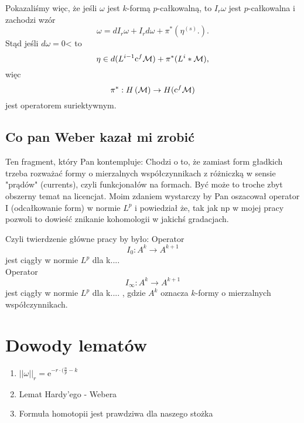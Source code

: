 \documentclass[licencjacka]{pracamgr}
\theoremstyle{definition}
\theoremstyle{definition}
\theoremstyle{plain}
\theoremstyle{plain}
\def\cfm{\ensuremath\mathrm{c}^f\mathcal{M}}
\def\M{\ensuremath\mathcal{M}}
\begin{document}
Pokazaliśmy więc, że jeśli $\omega$ jest $k$-formą $p$-całkowalną, to  $I_r \omega$ jest
$p$-całkowalna i zachodzi wzór
\[
    \omega = dI_r \omega + I_r d \omega + \pi^\ast 
    \left(
        \eta^{(s)}.
    \right).
\]
Stąd jeśli $d \omega = 0$< to 
\[
    \eta \in d(L^{i-1} \cfm) + \pi^\ast (L^i*\M),
\]
więc 
\[
    \pi^\ast: H \left( \M \right) \rightarrow H ( \cfm )
\]
jest operatorem suriektywnym. \\


\section{Co pan Weber kazał mi zrobić}
Ten fragment, który Pan kontempluje: Chodzi o to, że zamiast form gładkich
trzeba rozważać formy o mierzalnych współczynnikach z różniczką w sensie
"prądów" (currents), czyli funkcjonałów na formach. Być może to troche zbyt
obszerny temat na licencjat. Moim zdaniem wystarczy by Pan oszacował operator I
(odcałkowanie form) w normie $L^p$ i powiedział że, tak jak np w mojej pracy
pozwoli to dowieść znikanie kohomologii w jakichś gradacjach.

Czyli twierdzenie główne pracy by było: Operator
\[
 I_0:A^k \to A^{k+1}
\]
jest ciągły w normie $L^p$ dla k.... \\

Operator
\[
I_\infty:A^k \to A^{k+1}
\] jest ciągły w normie $L^p$ dla k.... ,
gdzie $A^k$ oznacza $k$-formy o mierzalnych współczynnikach. \\



\chapter{Dowody lematów}


\begin{enumerate}
    \item $||\omega||_r = \mathrm{e}^{-r \cdot (\frac{n}{p} - k }  $
    \item Lemat Hardy'ego - Webera
    \item Formuła homotopii jest prawdziwa dla naszego stożka
\end{enumerate}
\end{document}
